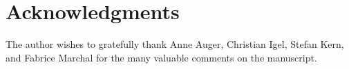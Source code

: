 \documentclass{article} %
\begin{document}
\section*{Acknowledgments}
The author wishes to gratefully thank Anne Auger, Christian Igel,
Stefan Kern, and Fabrice Marchal for the many valuable comments on the
manuscript.



%
%
%
% 
\end{document}

